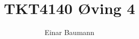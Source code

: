 

\usepackage{cancel}

\DeclareMathOperator\erf{erf}


\author{Einar Baumann}
\title{TKT4140 Øving 4}
\maketitle



